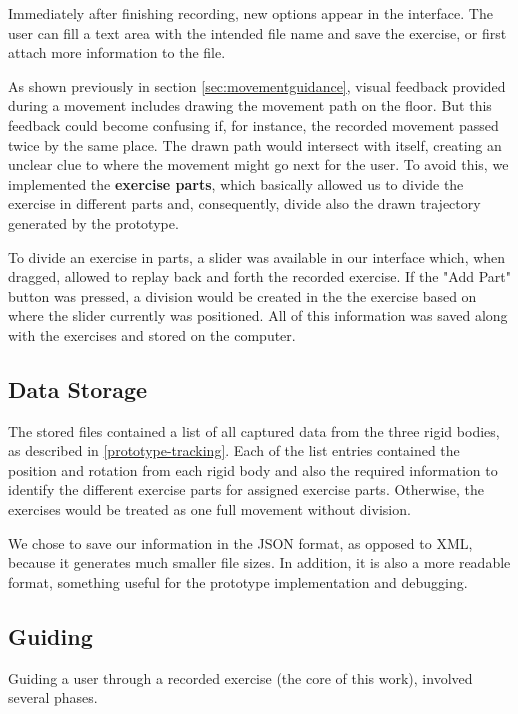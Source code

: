 Immediately after finishing recording, new options appear in the interface. 
The user can fill a text area with the intended file name and save the exercise, or first attach more information to the file.

As shown previously in section \ref{sec:movementguidance}, visual feedback provided during a movement includes drawing the movement path on the floor. 
But this feedback could become confusing if, for instance, the recorded movement passed twice by the same place. 
The drawn path would intersect with itself, creating an unclear clue to where the movement might go next for the user. 
To avoid this, we implemented the \textbf{exercise parts}, which basically allowed us to divide the exercise in different parts and, consequently, divide also the drawn trajectory generated by the prototype.

To divide an exercise in parts, a slider was available in our interface which, when dragged, allowed to replay back and forth the recorded exercise. 
If the "Add Part" button was pressed, a division would be created in the the exercise based on where the slider currently was positioned.
All of this information was saved along with the exercises and stored on the computer.



\subsection{Data Storage}

The stored files contained a list of all captured data from the three rigid bodies, as described in \ref{prototype-tracking}. 
Each of the list entries contained the position and rotation from each rigid body and also the required information to identify the different exercise parts for assigned exercise parts. Otherwise, the exercises would be treated as one full movement without division.

We chose to save our information in the JSON format, as opposed to XML, because it generates much smaller file sizes. In addition, it is also a more readable format, something useful for the prototype implementation and debugging.

\subsection{Guiding}

Guiding a user through a recorded exercise (the core of this work), involved several phases.

